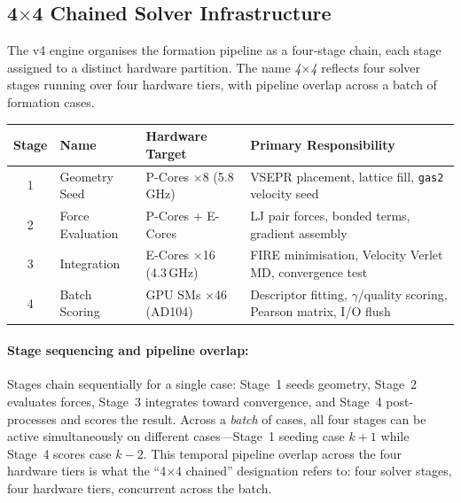 \documentclass[11pt]{article}
\begin{document}
\subsection{4$\times$4 Chained Solver Infrastructure}

The v4 engine organises the formation pipeline as a four-stage chain,
each stage assigned to a distinct hardware partition.
The name \textit{4$\times$4} reflects four solver stages running over
four hardware tiers, with pipeline overlap across a batch of formation
cases.

\begin{center}
\renewcommand{\arraystretch}{1.25}
\begin{tabular}{clll}
\toprule
Stage & Name & Hardware Target & Primary Responsibility \\
\midrule
1 & Geometry Seed    & P-Cores $\times$8 (5.8\,GHz)
  & VSEPR placement, lattice fill, \texttt{gas2} velocity seed \\
2 & Force Evaluation & P-Cores + E-Cores
  & LJ pair forces, bonded terms, gradient assembly \\
3 & Integration      & E-Cores $\times$16 (4.3\,GHz)
  & FIRE minimisation, Velocity Verlet MD, convergence test \\
4 & Batch Scoring    & GPU SMs $\times$46 (AD104)
  & Descriptor fitting, $\gamma$/quality scoring, Pearson matrix, I/O flush \\
\bottomrule
\end{tabular}
\end{center}

\paragraph{Stage sequencing and pipeline overlap:}

Stages chain sequentially for a single case: Stage~1 seeds geometry,
Stage~2 evaluates forces, Stage~3 integrates toward convergence, and
Stage~4 post-processes and scores the result.
Across a \textit{batch} of cases, all four stages can be active
simultaneously on different cases---Stage~1 seeding case $k{+}1$ while
Stage~4 scores case $k{-}2$.
This temporal pipeline overlap across the four hardware tiers is what
the ``4$\times$4 chained'' designation refers to: four solver stages,
four hardware tiers, concurrent across the batch.
\end{document}
